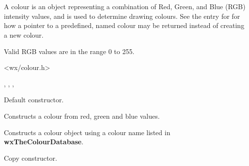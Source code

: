 \section{}\label{wxcolour}

A colour is an object representing a combination of Red, Green, and Blue (RGB) intensity values,
and is used to determine drawing colours. See the
entry for  for how a pointer to a predefined,
named colour may be returned instead of creating a new colour.

Valid RGB values are in the range 0 to 255.




<wx/colour.h>


, , ,\rtfsp
{}


\label{wxcolourconstr}


Default constructor.


Constructs a colour from red, green and blue values.


Constructs a colour object using a colour name
listed in {\bf wxTheColourDatabase}.


Copy constructor.








